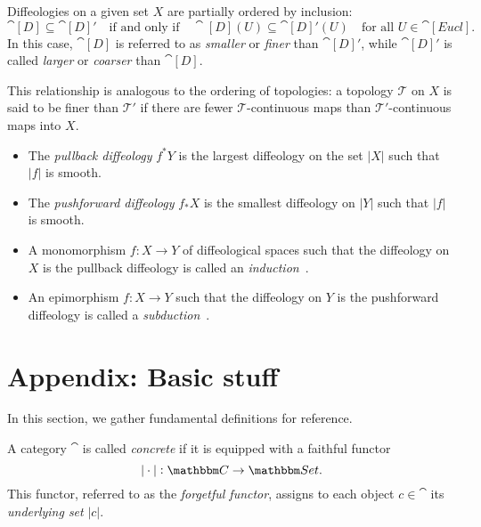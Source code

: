\documentclass[a4paper,11pt]{article}  %
\newcommand{\Eucl}{\cat[Eucl]}
\begin{document}
\begin{remark}%
Diffeologies on a given set $X$ are partially ordered by inclusion:
$$
\cat[D] \subseteq \cat[D]' \quad \text{if and only if} \quad \cat[D](U) \subseteq \cat[D]'(U) \quad \text{for all } U \in \Eucl.
$$
In this case, \(\cat[D]\) is referred to as \emph{smaller} or \emph{finer} than \(\cat[D]'\), while \(\cat[D]'\) is called \emph{larger} or \emph{coarser} than \(\cat[D]\).

This relationship is analogous to the ordering of topologies: a topology \(\mathcal{T}\) on \(X\) is said to be finer than \(\mathcal{T}'\) if there are fewer \(\mathcal{T}\)-continuous maps than \(\mathcal{T}'\)-continuous maps into \(X\).

\end{remark}
\begin{proposition}
\begin{itemize}
    \item The \emph{pullback diffeology} \(f^*Y\) is the largest diffeology on the set \(|X|\) such that \(|f|\) is smooth.
    \item The \emph{pushforward diffeology} \(f_*X\) is the smallest diffeology on \(|Y|\) such that \(|f|\) is smooth.
\end{itemize}
\end{proposition}

\begin{definition}
	\begin{itemize}
		\item A monomorphism \(f : X \to Y\) of diffeological spaces such that the diffeology on \(X\) is the pullback diffeology is called an \emph{induction}~\cite[Sec. 1.29]{IZ13}. 
		\item An epimorphism \(f : X \to Y\) such that the diffeology on \(Y\) is the pushforward diffeology is called a \emph{subduction}~\cite[Sec. 1.46]{IZ13}.

	\end{itemize}
\end{definition}



\appendix
\section*{Appendix: Basic stuff}
%
In this section, we gather fundamental definitions for reference.
%
\begin{definition}\label{def:concrete_cat}
A category $\cat$ is called \emph{concrete} if it is equipped with a faithful functor 
$$
|\cdot| : \cat \to \Set.
$$
This functor, referred to as the \emph{forgetful functor}, assigns to each object $c \in \cat$ its \emph{underlying set} \(|c|\).
\end{definition}
\end{document}
